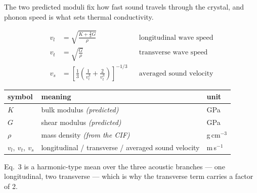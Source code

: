 \documentclass[aspectratio=169]{beamer}
\begin{document}
\begin{frame}

{\sffamily\scriptsize
The two predicted moduli fix how fast sound travels through the crystal, and
phonon speed is what sets thermal conductivity.}

\vspace{3pt}
\begin{align}
v_l &= \sqrt{\frac{K + \tfrac{4}{3}G}{\rho}}
   &&\text{longitudinal wave speed} \\[3pt]
v_t &= \sqrt{\frac{G}{\rho}}
   &&\text{transverse wave speed} \\[3pt]
v_s &= \left[\frac{1}{3}\left(\frac{1}{v_l^{3}} + \frac{2}{v_t^{3}}\right)\right]^{-1/3}
   &&\text{averaged sound velocity}
\end{align}

\vspace{4pt}
\begin{center}
{\sffamily\scriptsize
\begin{tabular}{@{}lll@{}}
\toprule
symbol & meaning & unit \\
\midrule
$K$ & bulk modulus \emph{(predicted)} & GPa \\
$G$ & shear modulus \emph{(predicted)} & GPa \\
$\rho$ & mass density \emph{(from the CIF)} & g\,cm$^{-3}$ \\
$v_l,\ v_t,\ v_s$ & longitudinal / transverse / averaged sound velocity & m\,s$^{-1}$ \\
\bottomrule
\end{tabular}}
\end{center}

\vspace{3pt}
{\sffamily\scriptsize\color{Muted}
Eq.~3 is a harmonic-type mean over the three acoustic branches --- one
longitudinal, two transverse --- which is why the transverse term carries a
factor of 2.}
\end{frame}
\end{document}
